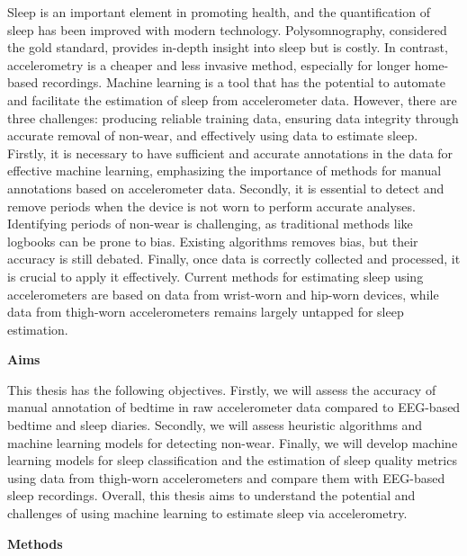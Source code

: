 \documentclass[
  9pt,
]{scrbook}
\begin{document}
Sleep is an important element in promoting health, and the
quantification of sleep has been improved with modern technology.
Polysomnography, considered the gold standard, provides in-depth insight
into sleep but is costly. In contrast, accelerometry is a cheaper and
less invasive method, especially for longer home-based recordings.
Machine learning is a tool that has the potential to automate and
facilitate the estimation of sleep from accelerometer data. However,
there are three challenges: producing reliable training data, ensuring
data integrity through accurate removal of non-wear, and effectively
using data to estimate sleep. Firstly, it is necessary to have
sufficient and accurate annotations in the data for effective machine
learning, emphasizing the importance of methods for manual annotations
based on accelerometer data. Secondly, it is essential to detect and
remove periods when the device is not worn to perform accurate analyses.
Identifying periods of non-wear is challenging, as traditional methods
like logbooks can be prone to bias. Existing algorithms removes bias,
but their accuracy is still debated. Finally, once data is correctly
collected and processed, it is crucial to apply it effectively. Current
methods for estimating sleep using accelerometers are based on data from
wrist-worn and hip-worn devices, while data from thigh-worn
accelerometers remains largely untapped for sleep estimation.

\textbf{Aims}

This thesis has the following objectives. Firstly, we will assess the
accuracy of manual annotation of bedtime in raw accelerometer data
compared to EEG-based bedtime and sleep diaries. Secondly, we will
assess heuristic algorithms and machine learning models for detecting
non-wear. Finally, we will develop machine learning models for sleep
classification and the estimation of sleep quality metrics using data
from thigh-worn accelerometers and compare them with EEG-based sleep
recordings. Overall, this thesis aims to understand the potential and
challenges of using machine learning to estimate sleep via
accelerometry.

\textbf{Methods}
\end{document}

